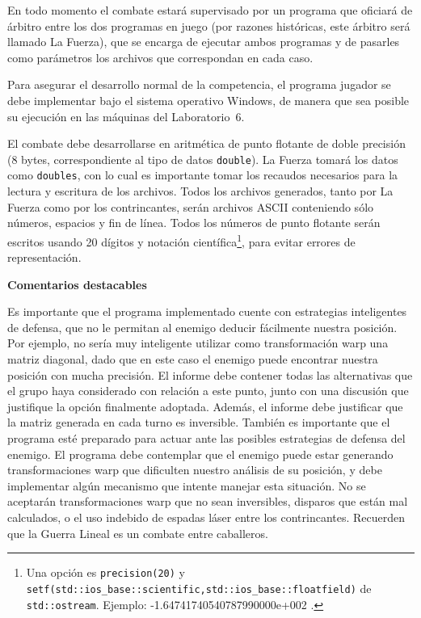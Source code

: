 En todo momento el combate estar\'a supervisado por un programa que oficiar\'a de \'arbitro entre
los dos programas en juego (por razones hist\'oricas, este \'arbitro ser\'a llamado La Fuerza),
que se encarga de ejecutar ambos programas y de pasarles como par\'ametros los archivos
que correspondan en cada caso. 

Para asegurar el desarrollo normal de la competencia, el
programa jugador se debe implementar bajo el sistema operativo Windows, de manera 
que sea posible su ejecuci\'on en las m\'aquinas del Laboratorio~6.

El combate debe desarrollarse en aritm\'etica de punto flotante de doble precisi\'on (8 bytes,
correspondiente al tipo de datos \verb|double|). La Fuerza tomar\'a los datos como \verb|doubles|, con lo
cual es importante tomar los recaudos necesarios para la lectura y escritura de los archivos. Todos los archivos generados, tanto por La Fuerza como por los
contrincantes, ser\'an archivos ASCII conteniendo s\'olo n\'umeros, espacios y fin de
l\'inea. Todos los n\'umeros de punto flotante ser\'an escritos usando 20 d\'igitos y
notaci\'on cient\'ifica\footnote{Una opci\'on es \texttt{precision(20)} y
\texttt{setf(std::ios\_base::scientific,std::ios\_base::floatfield)} de
\texttt{std::ostream}. Ejemplo: -1.64741740540787990000e+002 .}, para evitar errores
de representaci\'on.


{\bf Comentarios destacables}

Es importante que el programa implementado cuente con estrategias inteligentes de defensa,
que no le permitan al enemigo deducir f\'acilmente nuestra posici\'on. Por ejemplo, no ser\'ia
muy inteligente utilizar como transformaci\'on warp una matriz diagonal, dado que en este caso el
enemigo puede encontrar nuestra posici\'on con mucha precisi\'on. El informe debe contener
todas las alternativas que el grupo haya considerado con relaci\'on a este punto, junto con una
discusi\'on que justifique la opci\'on finalmente adoptada.
Adem\'as, el informe debe justificar que la matriz generada en cada turno es inversible.
Tambi\'en es importante que el programa est\'e preparado para actuar ante las posibles estrategias de defensa del enemigo. El programa debe contemplar que el enemigo puede estar
generando transformaciones warp que dificulten nuestro an\'alisis de su posici\'on, y debe implementar
alg\'un mecanismo que intente manejar esta situaci\'on.
No
se aceptar\'an transformaciones warp que no sean inversibles, disparos que est\'an mal calculados,
o el uso indebido de espadas l\'aser entre los contrincantes. Recuerden que la Guerra Lineal es
un combate entre caballeros.

